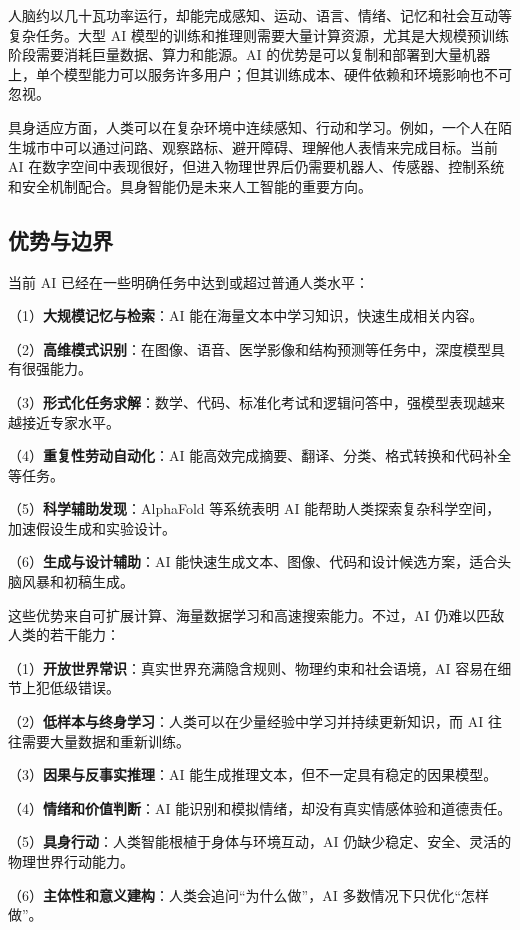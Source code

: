 \documentclass[UTF8,zihao=5,a4paper]{ctexart}
\begin{document}
人脑约以几十瓦功率运行，却能完成感知、运动、语言、情绪、记忆和社会互动等复杂任务。大型 AI 模型的训练和推理则需要大量计算资源，尤其是大规模预训练阶段需要消耗巨量数据、算力和能源。AI 的优势是可以复制和部署到大量机器上，单个模型能力可以服务许多用户；但其训练成本、硬件依赖和环境影响也不可忽视。

具身适应方面，人类可以在复杂环境中连续感知、行动和学习。例如，一个人在陌生城市中可以通过问路、观察路标、避开障碍、理解他人表情来完成目标。当前 AI 在数字空间中表现很好，但进入物理世界后仍需要机器人、传感器、控制系统和安全机制配合。具身智能仍是未来人工智能的重要方向。

\subsection{优势与边界}

当前 AI 已经在一些明确任务中达到或超过普通人类水平：

（1）\textbf{大规模记忆与检索}：AI 能在海量文本中学习知识，快速生成相关内容。

（2）\textbf{高维模式识别}：在图像、语音、医学影像和结构预测等任务中，深度模型具有很强能力。

（3）\textbf{形式化任务求解}：数学、代码、标准化考试和逻辑问答中，强模型表现越来越接近专家水平。

（4）\textbf{重复性劳动自动化}：AI 能高效完成摘要、翻译、分类、格式转换和代码补全等任务。

（5）\textbf{科学辅助发现}：AlphaFold 等系统表明 AI 能帮助人类探索复杂科学空间，加速假设生成和实验设计。

（6）\textbf{生成与设计辅助}：AI 能快速生成文本、图像、代码和设计候选方案，适合头脑风暴和初稿生成。

这些优势来自可扩展计算、海量数据学习和高速搜索能力。不过，AI 仍难以匹敌人类的若干能力：

（1）\textbf{开放世界常识}：真实世界充满隐含规则、物理约束和社会语境，AI 容易在细节上犯低级错误。

（2）\textbf{低样本与终身学习}：人类可以在少量经验中学习并持续更新知识，而 AI 往往需要大量数据和重新训练。

（3）\textbf{因果与反事实推理}：AI 能生成推理文本，但不一定具有稳定的因果模型。

（4）\textbf{情绪和价值判断}：AI 能识别和模拟情绪，却没有真实情感体验和道德责任。

（5）\textbf{具身行动}：人类智能根植于身体与环境互动，AI 仍缺少稳定、安全、灵活的物理世界行动能力。

（6）\textbf{主体性和意义建构}：人类会追问“为什么做”，AI 多数情况下只优化“怎样做”。
\end{document}
